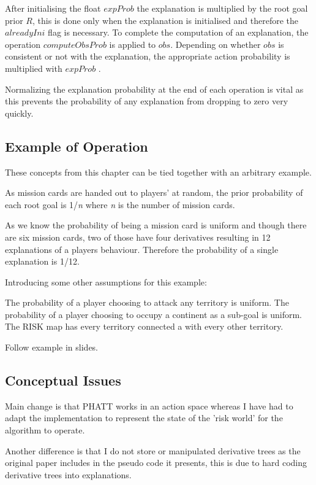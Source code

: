 \documentclass[parskip]{cs4rep}
\begin{document}
After initialising the float $expProb$ the explanation is multiplied by the root goal prior $R$, this is done only when the explanation is initialised and therefore the $alreadyIni$ flag is necessary. To complete the computation of an explanation, the operation $computeObsProb$ is applied to $obs$. Depending on whether $obs$ is consistent or not with the explanation, the appropriate action probability is multiplied with $expProb$ .

Normalizing the explanation probability at the end of each operation is vital as this prevents the probability of any explanation from dropping to zero very quickly. 

\subsection{Example of Operation}

These concepts from this chapter can be tied together with an arbitrary example.

As mission cards are handed out to players' at random, the prior probability of each root goal is 1/\textit{n} where \textit{n} is the number of mission cards.

As we know the probability of being a mission card is uniform and though there are six mission cards, two of those have four derivatives resulting in 12 explanations of a players behaviour. Therefore the probability of a single explanation is 1/12.

Introducing some other assumptions for this example:

The probability of a player choosing to attack any territory is uniform.
The probability of a player choosing to occupy a continent as a sub-goal is uniform.
The RISK map has every territory connected a with every other territory.

Follow example in slides.

\subsection{Conceptual Issues}

Main change is that PHATT works in an action space whereas I have had to adapt the implementation to represent the state of the 'risk world' for the algorithm to operate.

Another difference is that I do not store or manipulated derivative trees as the original paper includes in the pseudo code it presents, this is due to hard coding derivative trees into explanations.
\end{document}
